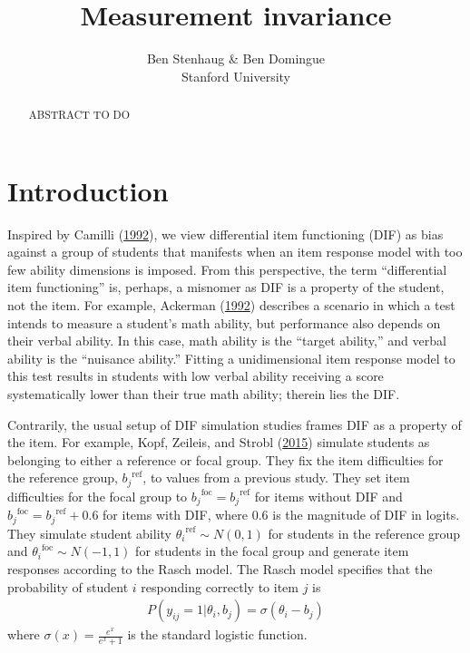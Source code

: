 \documentclass[
  11pt,
]{article}
\title{Measurement invariance}
\subtitle{Ben Stenhaug \& Ben Domingue\\
Stanford University}
\author{}
\date{\vspace{-2.5em}}
\begin{document}
\maketitle
\begin{abstract}
ABSTRACT TO DO
\end{abstract}

{
\setcounter{tocdepth}{2}
\tableofcontents
}
\clearpage

\hypertarget{introduction}{%
\section{Introduction}\label{introduction}}

Inspired by Camilli (\protect\hyperlink{ref-camilli1992conceptual}{1992}), we view differential item functioning (DIF) as bias against a group of students that manifests when an item response model with too few ability dimensions is imposed. From this perspective, the term \enquote{differential item functioning} is, perhaps, a misnomer as DIF is a property of the student, not the item. For example, Ackerman (\protect\hyperlink{ref-ackerman1992didactic}{1992}) describes a scenario in which a test intends to measure a student's math ability, but performance also depends on their verbal ability. In this case, math ability is the \enquote{target ability,} and verbal ability is the \enquote{nuisance ability.} Fitting a unidimensional item response model to this test results in students with low verbal ability receiving a score systematically lower than their true math ability; therein lies the DIF.

Contrarily, the usual setup of DIF simulation studies frames DIF as a property of the item. For example, Kopf, Zeileis, and Strobl (\protect\hyperlink{ref-kopf2015framework}{2015}) simulate students as belonging to either a reference or focal group. They fix the item difficulties for the reference group, \({b_j}^{\text{ref}}\), to values from a previous study. They set item difficulties for the focal group to \({b_j}^{\text{foc}} = {b_j}^{\text{ref}}\) for items without DIF and \({b_j}^{\text{foc}} = {b_j}^{\text{ref}} + 0.6\) for items with DIF, where 0.6 is the magnitude of DIF in logits. They simulate student ability \({\theta_i}^{\text{ref}} \sim N(0,1)\) for students in the reference group and \({\theta_i}^{\text{foc}} \sim N(-1,1)\) for students in the focal group and generate item responses according to the Rasch model. The Rasch model specifies that the probability of student \(i\) responding correctly to item \(j\) is
\begin{align}
    P(y_{ij} = 1 | \theta_i, b_j) = \sigma(\theta_i - b_j)
\end{align}
where \(\sigma(x) = \frac{e^x}{e^x + 1}\) is the standard logistic function.
\end{document}
